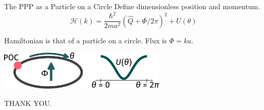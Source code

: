 \documentclass[aspectratio=169,t]{beamer}
\begin{document}
\begin{frame}{The PPP as a Particle on a Circle}
	Define dimensionless position and momentum.
	\[\mathcal{H}(k) = \frac{\hbar^2}{2ma^2}\left(\hat Q + \Phi/2\pi\right)^2 + U(\theta)\]

	\vspace*{\fill}
	Hamiltonian is that of a \alert{particle on a circle}. Flux is \(\Phi = ka\).

	\vspace*{\fill}
	\includegraphics[width=0.6\textwidth]{POC.pdf}
\end{frame}


\begin{frame}[c]{}
	\LARGE{THANK YOU.}
\end{frame}
\end{document}
